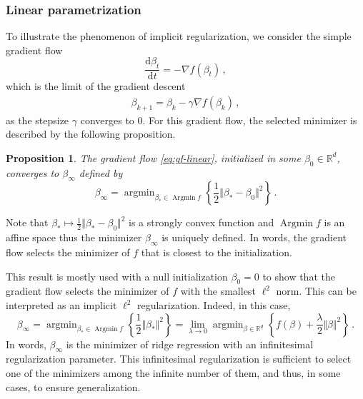 \documentclass[11pt,reqno]{article}
\DeclareMathOperator*{\argmin}{argmin}
\DeclareMathOperator*{\Argmin}{Argmin}
\newcommand{\diff}{\mathrm{d}}
\newcommand{\R}{\mathbb{R}}
\numberwithin{equation}{section}
\theoremstyle{plain}
\newtheorem{proposition}[assumption]{Proposition}
\theoremstyle{definition}
\theoremstyle{remark}
\begin{document}
\subsubsection{Linear parametrization}

To illustrate the phenomenon of implicit regularization, we consider the simple gradient flow 
\begin{equation}
	\label{eq:gf-linear}
	\frac{\diff \beta_t}{\diff t} = - \nabla f(\beta_t) \, , 
\end{equation}
which is the limit of the gradient descent 
\begin{align}
	\label{eq:gd-linear}
	\beta_{k+1} = \beta_k - \gamma \nabla f(\beta_k) \, ,
\end{align}
as the stepsize $\gamma$ converges to $0$. For this gradient flow, the selected minimizer is described by the following proposition. 

\begin{proposition}
	\label{prop:implicit-reg-linear}
	The gradient flow \eqref{eq:gf-linear}, initialized in some $\beta_0 \in \R^d$, converges to $\beta_\infty$ defined by 
	\begin{equation*}
		\beta_\infty = \argmin_{\beta_* \in \Argmin f} \left\{ \frac{1}{2} \Vert \beta_* - \beta_0 \Vert^2 \right\} \, . 
	\end{equation*}
\end{proposition}
Note that $\beta_* \mapsto \frac{1}{2} \Vert \beta_* - \beta_0 \Vert^2$ is a strongly convex function and $\Argmin f$ is an affine space thus the minimizer $\beta_\infty$ is uniquely defined. In words, the gradient flow selects the minimizer of $f$ that is closest to the initialization. 

This result is mostly used with a null initialization $\beta_0 = 0$ to show that the gradient flow selects the minimizer of $f$ with the smallest $\ell^2$ norm. This can be interpreted as an implicit $\ell^2$ regularization. Indeed, in this case, 
\begin{equation}
	\label{eq:implicit-reg-ridge}
	\beta_\infty = \argmin_{\beta_* \in \Argmin f} \left\{ \frac{1}{2} \Vert \beta_* \Vert^2 \right\} = \lim_{\lambda\to 0} \argmin_{\beta \in \R^d} \left\{f(\beta) + \frac{\lambda}{2} \Vert \beta \Vert^2 \right\}\, . 
\end{equation}	
In words, $\beta_\infty$ is the minimizer of ridge regression with an infinitesimal regularization parameter. This infinitesimal regularization is sufficient to select one of the minimizers among the infinite number of them, and thus, in some cases, to ensure generalization. 
\end{document}
